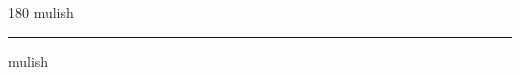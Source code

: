 
\begin{frame}
\begin{center}
\begin{turn}{180}
{\fontsize{2.5cm}{1em}\selectfont mulish}
\end{turn}
\vspace{1em}\par  
\hrule
\vspace{1em}\par  
{\fontsize{2.5cm}{1em}\selectfont mulish}
\end{center}
\end{frame}
